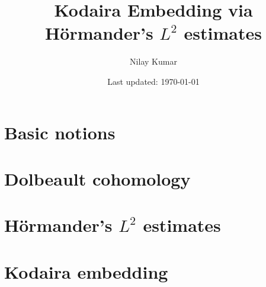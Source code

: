 \documentclass{../mathnotes}
\title{Kodaira Embedding via H\"ormander's $L^2$ estimates}
\author{Nilay Kumar}
\date{Last updated: \today}
\begin{document}
\maketitle

\section{Basic notions}

\section{Dolbeault cohomology}

\section{H\"ormander's $L^2$ estimates}

\section{Kodaira embedding}
\end{document}
